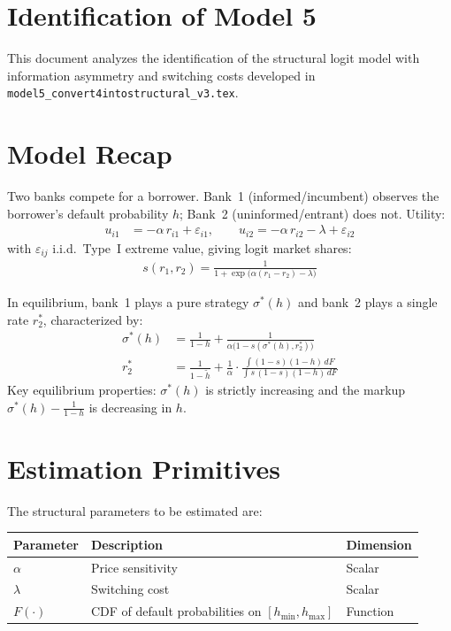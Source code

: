 \documentclass[12pt]{article}
\theoremstyle{plain}
\theoremstyle{plain}
\theoremstyle{definition}  %
\theoremstyle{remark}  %
\begin{document}
\section*{Identification of Model 5}

This document analyzes the identification of the structural logit model with information asymmetry and switching costs developed in \texttt{model5\_convert4intostructural\_v3.tex}.


\section{Model Recap}

Two banks compete for a borrower. Bank~1 (informed/incumbent) observes the borrower's default probability $h$; Bank~2 (uninformed/entrant) does not. Utility:
\begin{align*}
    u_{i1} &= -\alpha\, r_{i1} + \varepsilon_{i1}, \qquad u_{i2} = -\alpha\, r_{i2} - \lambda + \varepsilon_{i2}
\end{align*}
with $\varepsilon_{ij}$ i.i.d.\ Type~I extreme value, giving logit market shares:
\begin{align}\label{eq:share}
    s(r_1, r_2) = \frac{1}{1 + \exp\!\big(\alpha(r_1 - r_2) - \lambda\big)}
\end{align}

In equilibrium, bank~1 plays a pure strategy $\sigma^*(h)$ and bank~2 plays a single rate $r_2^*$, characterized by:
\begin{align}
    \sigma^*(h) &= \frac{1}{1-h} + \frac{1}{\alpha\big(1-s(\sigma^*(h), r_2^*)\big)} \label{eq:sigma}\\[4pt]
    r_2^* &= \frac{1}{1 - \tilde{h}} + \frac{1}{\alpha}\cdot\frac{\int (1-s)(1-h)\, dF}{\int s\,(1-s)(1-h)\, dF} \label{eq:r2}
\end{align}
Key equilibrium properties: $\sigma^*(h)$ is strictly increasing and the markup $\sigma^*(h) - \frac{1}{1-h}$ is decreasing in $h$.


\section{Estimation Primitives}\label{sec:primitives}

The structural parameters to be estimated are:

\begin{center}
\renewcommand{\arraystretch}{1.3}
\begin{tabular}{lll}
\toprule
\textbf{Parameter} & \textbf{Description} & \textbf{Dimension} \\
\midrule
$\alpha$ & Price sensitivity & Scalar \\
$\lambda$ & Switching cost & Scalar \\
$F(\cdot)$ & CDF of default probabilities on $[h_{\min}, h_{\max}]$ & Function \\
\bottomrule
\end{tabular}
\end{center}
\end{document}
